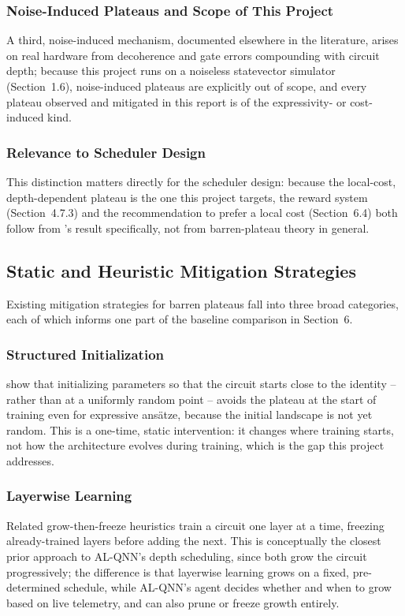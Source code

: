 \subsubsection{Noise-Induced Plateaus and Scope of This Project}
A third, noise-induced mechanism, documented elsewhere in the literature, arises on real hardware from decoherence and gate errors compounding with circuit depth; because this project runs on a noiseless statevector simulator (Section~1.6), noise-induced plateaus are explicitly out of scope, and every plateau observed and mitigated in this report is of the expressivity- or cost-induced kind.

\subsubsection{Relevance to Scheduler Design}
This distinction matters directly for the scheduler design: because the local-cost, depth-dependent plateau is the one this project targets, the reward system (Section~4.7.3) and the recommendation to prefer a local cost (Section~6.4) both follow from \citet{cerezo2021cost}'s result specifically, not from barren-plateau theory in general.

\subsection{Static and Heuristic Mitigation Strategies}
Existing mitigation strategies for barren plateaus fall into three broad categories, each of which informs one part of the baseline comparison in Section~6.

\subsubsection{Structured Initialization}
\citet{grant2019initialization} show that initializing parameters so that the circuit starts close to the identity -- rather than at a uniformly random point -- avoids the plateau at the start of training even for expressive ansätze, because the initial landscape is not yet random. This is a one-time, static intervention: it changes where training starts, not how the architecture evolves during training, which is the gap this project addresses.

\subsubsection{Layerwise Learning}
Related grow-then-freeze heuristics train a circuit one layer at a time, freezing already-trained layers before adding the next. This is conceptually the closest prior approach to AL-QNN's depth scheduling, since both grow the circuit progressively; the difference is that layerwise learning grows on a fixed, pre-determined schedule, while AL-QNN's agent decides whether and when to grow based on live telemetry, and can also prune or freeze growth entirely.

